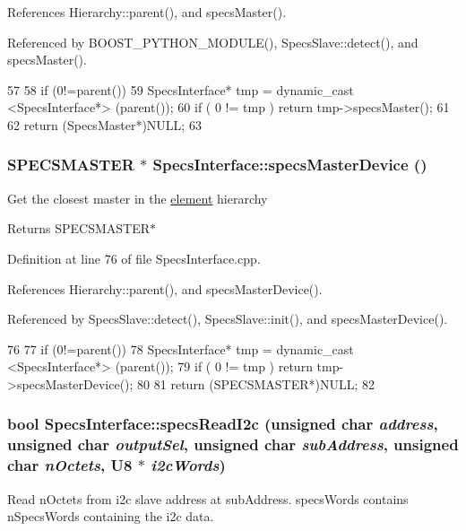 References Hierarchy::parent(), and specsMaster().

Referenced by BOOST\_\-PYTHON\_\-MODULE(), SpecsSlave::detect(), and specsMaster().


\begin{DoxyCode}
57                                         {
58     if (0!=parent()){
59     SpecsInterface* tmp = dynamic_cast <SpecsInterface*> (parent());
60     if ( 0 != tmp ) return tmp->specsMaster();
61   }
62   return (SpecsMaster*)NULL;
63 }
\end{DoxyCode}
\hypertarget{classSpecsInterface_aa8aeaa74acf2c913905ea996d153a6ef}{
\subsubsection[{specsMasterDevice}]{\setlength{\rightskip}{0pt plus 5cm}SPECSMASTER $\ast$ SpecsInterface::specsMasterDevice ()}}
\label{classSpecsInterface_aa8aeaa74acf2c913905ea996d153a6ef}
Get the closest master in the \hyperlink{namespaceelement}{element} hierarchy \begin{DoxyReturn}{Returns}
SPECSMASTER$\ast$ 
\end{DoxyReturn}


Definition at line 76 of file SpecsInterface.cpp.

References Hierarchy::parent(), and specsMasterDevice().

Referenced by SpecsSlave::detect(), SpecsSlave::init(), and specsMasterDevice().


\begin{DoxyCode}
76                                               {
77     if (0!=parent()){
78     SpecsInterface* tmp = dynamic_cast <SpecsInterface*> (parent());
79     if ( 0 != tmp ) return tmp->specsMasterDevice();
80     }
81   return (SPECSMASTER*)NULL;
82 }
\end{DoxyCode}
\hypertarget{classSpecsInterface_ad27047eaae1bc333ee0c1a6c871a407b}{
\subsubsection[{specsReadI2c}]{\setlength{\rightskip}{0pt plus 5cm}bool SpecsInterface::specsReadI2c (unsigned char {\em address}, \/  unsigned char {\em outputSel}, \/  unsigned char {\em subAddress}, \/  unsigned char {\em nOctets}, \/  {\bf U8} $\ast$ {\em i2cWords})}}
\label{classSpecsInterface_ad27047eaae1bc333ee0c1a6c871a407b}
Read nOctets from i2c slave address at subAddress. specsWords contains nSpecsWords containing the i2c data.

